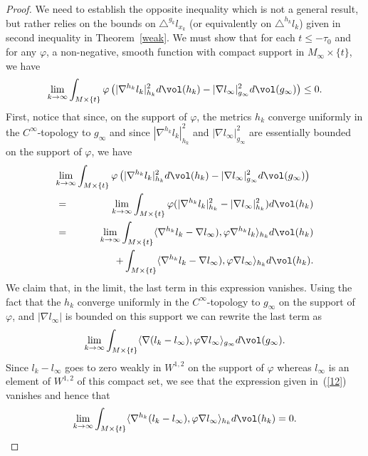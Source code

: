 \begin{proof}
 We need to establish the opposite
inequality which is not a general result, but rather relies on  the
bounds on $\triangle^{g_k}l_{x_k}$ (or equivalently on
$\triangle^{h_k}l_k$) given in second inequality in
Theorem~\ref{weak}. We must show that for each $t\le -\tau_0$ and
for any $\varphi$, a non-negative, smooth function with compact
support in $M_\infty\times \{t\}$, we have
$$\lim_{k\rightarrow\infty}\int_{M\times\{t\}}\varphi
\left(|\nabla^{h_k} l_k|_{h_k}^2d\vol(h_k)-|\nabla
l_\infty|_{g_\infty}^2d\vol(g_\infty)\right)\le 0.$$ First,
notice that since, on the support of $\varphi$, the metrics $h_k$
converge uniformly in the $C^\infty$-topology to $g_\infty$ and
since $|\nabla^{h_k}l_k|_{h_k}^2$ and $|\nabla
l_\infty|_{g_\infty}^2$ are essentially bounded on the support of
$\varphi$, we have
\begin{eqnarray}\nonumber
\lefteqn{\lim_{k\rightarrow\infty}\int_{M\times\{t\}}\varphi
\left(|\nabla^{h_k}l_k|_{h_k}^2d\vol(h_k)-|\nabla
l_\infty|_{g_\infty}^2d\vol(g_\infty) \right)} & & \\
&  = & \lim_{k\rightarrow\infty}\int_{M\times\{t\}}\varphi (|
\nabla^{h_k} l_k|_{h_k}^2-|\nabla
l_\infty|_{h_k}^2)d\vol(h_k) \nonumber \\
\nonumber& = & \lim_{k\rightarrow\infty}\int_{M\times\{t\}}\langle\nabla^{h_k}
l_k-\nabla l_\infty),\varphi\nabla^{h_k} l_k\rangle_{h_k}d\vol(h_k)
\\ & & \hskip.55in+\int_{M\times\{t\}}\langle\nabla^{h_k}l_k-\nabla l_\infty),
\varphi\nabla l_\infty\rangle_{h_k}d\vol(h_k).
\label{11}\end{eqnarray} We claim that, in the limit, the last term
in this expression vanishes. Using the fact that the $h_k$ converge
uniformly in the $C^\infty$-topology to $g_\infty$ on the support of
$\varphi$, and $|\nabla l_\infty|$ is bounded on this support we can
rewrite the last term as
\begin{equation}\label{12}
\lim_{k\rightarrow\infty}\int_{M\times\{t\}}\langle\nabla(
l_k-l_\infty),\varphi\nabla l_\infty\rangle_{g_\infty}d\vol(
g_\infty).\end{equation} Since $ l_k-l_\infty$ goes to zero weakly
in $W^{1,2}$ on the support of $\varphi$  whereas $ l_\infty$ is an
element of $W^{1,2}$ of this compact set, we see that the expression
given in~(\ref{12}) vanishes and hence that
$$\lim_{k\rightarrow\infty}\int_{M\times\{t\}}\langle\nabla^{h_k}(
l_k-l_\infty),\varphi\nabla l_\infty\rangle_{h_k}d\vol(h_k)=0.$$


\end{proof}
